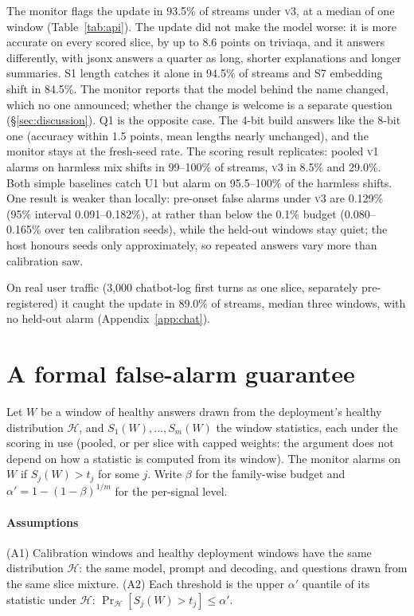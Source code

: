 \documentclass[11pt]{article}
\newcommand{\vone}{\textsc{v1}}
\newcommand{\vthree}{\textsc{v3}}
\begin{document}
The monitor flags the update in 93.5\% of streams under \vthree{}, at a median of
one window (Table~\ref{tab:api}). The update did not make the model worse: it is
more accurate on every scored slice, by up to 8.6 points on \textsf{triviaqa}, and
it answers differently, with \textsf{jsonx} answers a quarter as long, shorter
explanations and longer summaries. S1 length catches it alone in 94.5\% of streams and S7 embedding shift
in 84.5\%. The monitor reports that the model behind the name changed, which no
one announced; whether the change is welcome is a separate question
(\S\ref{sec:discussion}). Q1 is the opposite case. The 4-bit
build answers like the 8-bit one (accuracy within 1.5 points, mean lengths nearly
unchanged),
and the monitor stays at the fresh-seed rate. The scoring result replicates:
pooled \vone{} alarms on harmless mix shifts in 99--100\% of streams, \vthree{} in
8.5\% and 29.0\%. Both simple baselines catch U1 but alarm on 95.5--100\% of
the harmless shifts. One result is weaker than locally:
pre-onset false alarms under \vthree{} are 0.129\% (95\% interval 0.091--0.182\%),
at rather than below the 0.1\% budget (0.080--0.165\% over ten calibration
seeds), while the held-out windows stay quiet; the host honours seeds only
approximately, so repeated answers vary more than calibration saw.

On real user traffic (3{,}000 chatbot-log first turns as one slice, separately
pre-registered) it caught the update in 89.0\% of streams, median three windows,
with no held-out alarm (Appendix~\ref{app:chat}).

\section{A formal false-alarm guarantee}
\label{app:guarantee}
Let $W$ be a window of healthy answers drawn from the deployment's healthy
distribution $\mathcal{H}$, and $S_1(W),\dots,S_m(W)$ the window statistics, each
under the scoring in use (pooled, or per slice with capped weights: the argument
does not depend on how a statistic is computed from its window). The monitor alarms
on $W$ if $S_j(W)>t_j$ for some $j$. Write $\beta$ for the family-wise budget and
$\alpha'=1-(1-\beta)^{1/m}$ for the per-signal level.

\paragraph{Assumptions}
(A1) Calibration windows and healthy deployment windows have the same distribution
$\mathcal{H}$: the same model, prompt and decoding, and questions drawn from the
same slice mixture. (A2) Each threshold is the upper $\alpha'$ quantile of its
statistic under $\mathcal{H}$: $\Pr_{\mathcal{H}}[S_j(W)>t_j]\le\alpha'$.
\end{document}
